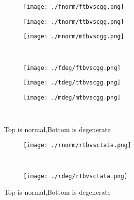 \documentclass[aps,floats,floatfix,nofootinbib]{revtex4-1}
\begin{document}
\begin{center}
\begin{figure}
\begin{subfigure}{0.3\textwidth}
\texttt{[image: ./fnorm/ftbvscgg.png]}
\label{}
\end{subfigure}
\begin{subfigure}{0.3\textwidth}
\texttt{[image: ./tnorm/ttbvscgg.png]}
\label{}
\end{subfigure}
\begin{subfigure}{0.3\textwidth}
\texttt{[image: ./mnorm/mtbvscgg.png]}
\label{}
\end{subfigure}\\
\begin{subfigure}{0.3\textwidth}
\texttt{[image: ./fdeg/ftbvscgg.png]}
\label{}
\end{subfigure}
\begin{subfigure}{0.3\textwidth}
\texttt{[image: ./tdeg/ttbvscgg.png]}
\label{}
\end{subfigure}
\begin{subfigure}{0.3\textwidth}
\texttt{[image: ./mdeg/mtbvscgg.png]}
\label{}
\end{subfigure}\\
\caption{Top is normal,Bottom is degenerate}
\end{figure}
\end{center}

\begin{center}
\begin{figure}
\begin{subfigure}{1.0\textwidth}
\texttt{[image: ./rnorm/rtbvsctata.png]}
\label{}
\end{subfigure}\\
\begin{subfigure}{1.0\textwidth}
\texttt{[image: ./rdeg/rtbvsctata.png]}
\label{}
\end{subfigure}
\caption{Top is normal,Bottom is degenerate}
\end{figure}
\end{center}
\end{document}
